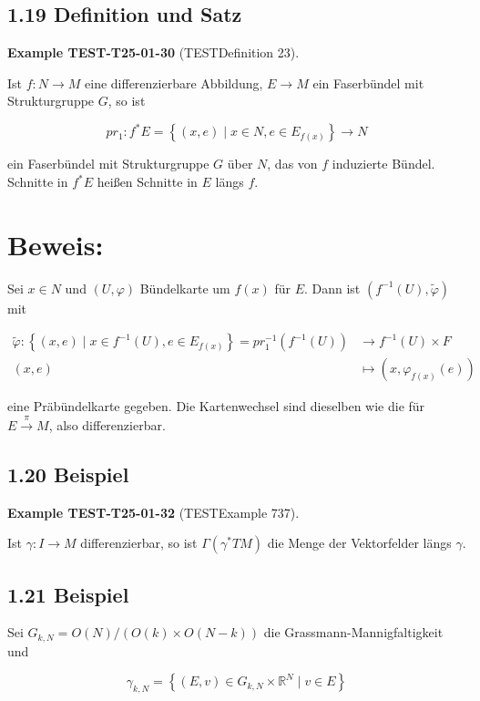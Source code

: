 \documentclass[10pt, letterpaper]{article}
\newcommand{\CustomHeading}[3]{%
  \par\medskip\noindent%
  \textbf{#1 #2} \textnormal{(#3)}.\enskip%
}
\newenvironment{EXA}[2]{\begin{unitbox}\CustomHeading{Example}{#1}{#2}}{\end{unitbox}}
\begin{document}
\subsection*{1.19 Definition und Satz}
\begin{EXA}{TEST-T25-01-30}{TESTDefinition 23}
Ist $f: N \rightarrow M$ eine differenzierbare Abbildung, $E \rightarrow M$ ein Faserbündel mit Strukturgruppe $G$, so ist

$$
p r_{1}: f^{*} E=\left\{(x, e) \mid x \in N, e \in E_{f(x)}\right\} \rightarrow N
$$

ein Faserbündel mit Strukturgruppe $G$ über $N$, das von $f$ induzierte Bündel. Schnitte in $f^{*} E$ heißen Schnitte in $E$ längs $f$.
\end{EXA}

\section*{Beweis:}
Sei $x \in N$ und $(U, \varphi)$ Bündelkarte um $f(x)$ für $E$. Dann ist $\left(f^{-1}(U), \tilde{\varphi}\right)$ mit

$$
\begin{aligned}
\tilde{\varphi}:\left\{(x, e) \mid x \in f^{-1}(U), e \in E_{f(x)}\right\}=p r_{1}^{-1}\left(f^{-1}(U)\right) & \longrightarrow f^{-1}(U) \times F \\
(x, e) & \mapsto\left(x, \varphi_{f(x)}(e)\right)
\end{aligned}
$$

eine Präbündelkarte gegeben. Die Kartenwechsel sind dieselben wie die für $E \xrightarrow{\pi} M$, also differenzierbar.

\subsection*{1.20 Beispiel}
\begin{EXA}{TEST-T25-01-32}{TESTExample 737}
Ist $\gamma: I \rightarrow M$ differenzierbar, so ist $\Gamma\left(\gamma^{*} T M\right)$ die Menge der Vektorfelder längs $\gamma$.
\end{EXA}

\subsection*{1.21 Beispiel}
Sei $G_{k, N}=O(N) /(O(k) \times O(N-k))$ die Grassmann-Mannigfaltigkeit und

$$
\gamma_{k, N}=\left\{(E, v) \in G_{k, N} \times \mathbb{R}^{N} \mid v \in E\right\}
$$
\end{document}
